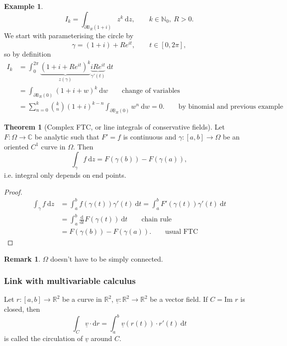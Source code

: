 \documentclass[a4paper]{article}
\theoremstyle{definition}
\newtheorem{thm}[defn]{Theorem}
\newtheorem{example}[defn]{Example}
\newtheorem*{remark}{Remark}
\begin{document}
\begin{example}
\[
I_k = \int_{\partial \mathbb B_R(1+i)} z^k \ \mathrm d z,\qquad k\in \mathbb N_0,\ R>0 .
\]
We start with parameterising the circle by
\[
\gamma = (1+i) + Re^{it},\qquad t\in [0,2\pi],
\]
so by definition
\[
\begin{aligned}
I_k &= \int_0^{2\pi} \underbrace{\left(1+i+ Re^{it} \right)^k}_{z(\gamma)} \underbrace{i Re^{it}}_{\gamma '(t)} \ \mathrm d t \\
&= \int_{\partial \mathbb B_R(0)} (1+i+w)^k \ \mathrm d w \qquad \text{change of variables} \\
&= \sum_{n=0} ^k \binom{k}{n} (1+i)^{k-n} \int_{\partial \mathbb B_R(0)} w^n \ \mathrm d w = 0. \qquad \text{by binomial and previous example}
\end{aligned}
\]
\end{example}

\begin{thm}[Complex FTC, or line integrals of conservative fields]
Let $F:\Omega \rightarrow \mathbb C$ be analytic such that $F'=f$ is continuous and $\gamma:[a,b]\rightarrow \Omega$ be an oriented $C^1$ curve in $\Omega$. Then
\[
\int_\gamma f \ \mathrm d z = F(\gamma(b))-F(\gamma(a)),
\]
i.e. integral only depends on end points.
\end{thm}
\begin{proof}
\[
\begin{aligned}
\int_\gamma f \ \mathrm d z &= \int_a^b f(\gamma(t)) \gamma '(t) \ \mathrm d t = \int_a^b F'(\gamma(t)) \gamma'(t) \ \mathrm d t \\&= \int_a^b \frac{\mathrm d}{\mathrm d t} F(\gamma(t)) \ \mathrm d t \qquad \text{chain rule} \\&=F(\gamma(b))-F(\gamma(a)). \qquad \text{usual FTC}
\end{aligned}
\]
\end{proof}
\begin{remark}
$\Omega$ doesn't have to be simply connected.
\end{remark}

\subsubsection{Link with multivariable calculus}
Let $r:[a,b]\rightarrow \mathbb R^2$ be a curve in $\mathbb R^2$, $\underline v: \mathbb R^2\rightarrow \mathbb R^2$ be a vector field. If $C=\text{Im }r$ is closed, then 
\[
\int_C \underline v \cdot \mathrm d r = \int_a^b \underline v(r(t)) \cdot r'(t) \ \mathrm d t
\]
is called the circulation of $\underline v$ around $C$.
\end{document}
